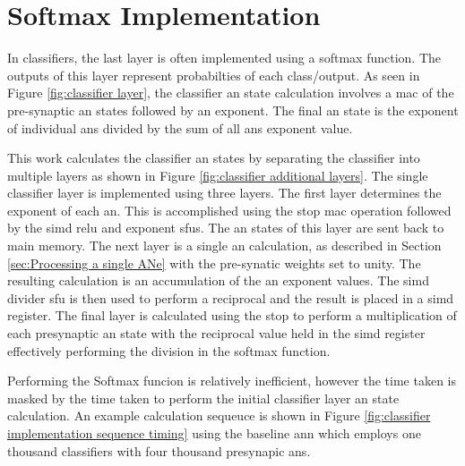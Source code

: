 
\chapter{Softmax Implementation}
\label{sec:Appendix-A}
\label{sec:Softmax Implementation}

In classifiers, the last layer is often implemented using a softmax \cite{wikipedia_softmax}\cite{stanford_softmax} function.
The outputs of this layer represent probabilties of each class/output.
As seen in Figure \ref{fig:classifier layer}, the classifier \ac{an} state calculation involves a \ac{mac} of the pre-synaptic \ac{an} states followed by an exponent.
The final \ac{an} state is the exponent of individual \acp{an} divided by the sum of all \acp{an} exponent value.

This work calculates the classifier \ac{an} states by separating the classifier into multiple layers as shown in Figure \ref{fig:classifier additional layers}.
The single classifier layer is implemented using three layers.
The first layer determines the exponent of each \ac{an}. This is accomplished using the \ac{stop} \ac{mac} operation followed by the \ac{simd} \ac{relu} and exponent \acp{sfu}.
The \ac{an} states of this layer are sent back to main memory.
The next layer is a single \ac{an} calculation, as described in Section \ref{sec:Processing a single ANe} with the pre-synatic weights set to unity.
The resulting calculation is an accumulation of the \ac{an} exponent values.
The \ac{simd} divider \ac{sfu} is then used to perform a reciprocal and the result is placed in a \ac{simd} register.
The final layer is calculated using the \ac{stop} to perform a multiplication of each presynaptic \ac{an} state with the reciprocal value held in the \ac{simd} register effectively performing the division in the softmax function.

Performing the Softmax funcion is relatively inefficient, however the time taken is masked by the time taken to perform the initial classifier layer \ac{an} state calculation.
An example calculation sequeuce is shown in Figure \ref{fig:classifier implementation sequence timing} using the baseline \ac{ann} which employs one thousand classifiers with four thousand presynapic \acp{an}.


